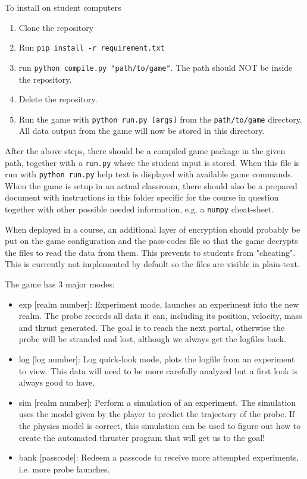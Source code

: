 \documentclass[11pt, twocolumn]{article}
\begin{document}
To install on student computers
\begin{enumerate}
\item Clone the repository\footnotemark[\ref{link}]
\item Run \texttt{pip install -r requirement.txt}
\item run \texttt{python compile.py "path/to/game"}. The path should NOT be inside the repository. 
\item Delete the repository.
\item Run the game with \texttt{python run.py [args]} from the \texttt{path/to/game} directory. All data output from the game will now be stored in this directory.
\end{enumerate}

After the above steps, there should be a compiled game package in the given path, together with a \texttt{run.py} where the student input is stored. When this file is run with \texttt{python run.py} help text is displayed with available game commands. When the game is setup in an actual classroom, there should also be a prepared document with instructions in this folder specific for the course in question together with other possible needed information, e.g. a \texttt{numpy} cheat-sheet.

When deployed in a course, an additional layer of encryption should probably be put on the game configuration and the pass-codes file so that the game decrypts the files to read the data from them. This prevents to students from "cheating". This is currently not implemented by default so the files are visible in plain-text.

The game has 3 major modes:
\begin{itemize}
    \item exp [realm number]: Experiment mode, launches an experiment into the new realm. The probe records all data it can, including its position, velocity, mass and thrust generated. The goal is to reach the next portal, otherwise the probe will be stranded and lost, although we always get the logfiles back.
    \item log [log number]: Log quick-look mode, plots the logfile from an experiment to view. This data will need to be more carefully analyzed but a first look is always good to have.
    \item sim [realm number]: Perform a simulation of an experiment. The simulation uses the model given by the player to predict the trajectory of the probe. If the physics model is correct, this simulation can be used to figure out how to create the automated thruster program that will get us to the goal!
    \item bank [passcode]: Redeem a passcode to receive more attempted experiments, i.e. more probe launches.
\end{itemize}
\end{document}
